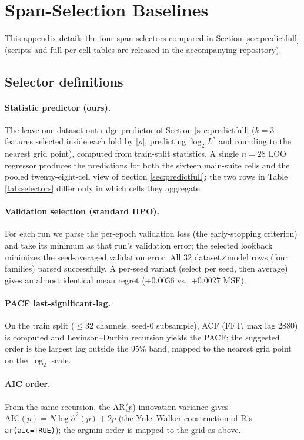 \section{Span-Selection Baselines}
\label{app:select}

This appendix details the four span selectors compared in Section \ref{sec:predictfull} (scripts and full per-cell tables are released in the accompanying repository).

\subsection{Selector definitions}

\paragraph{Statistic predictor (ours).} The leave-one-dataset-out ridge predictor of Section \ref{sec:predictfull} ($k{=}3$ features selected inside each fold by $|\rho|$, predicting $\log_2 L^*$ and rounding to the nearest grid point), computed from train-split statistics. A single $n{=}28$ LOO regressor produces the predictions for both the sixteen main-suite cells and the pooled twenty-eight-cell view of Section \ref{sec:predictfull}; the two rows in Table \ref{tab:selectors} differ only in which cells they aggregate.

\paragraph{Validation selection (standard HPO).} For each run we parse the per-epoch validation loss (the early-stopping criterion) and take its minimum as that run's validation error; the selected lookback minimizes the seed-averaged validation error. All 32 dataset$\times$model rows (four families) parsed successfully. A per-seed variant (select per seed, then average) gives an almost identical mean regret ($+0.0036$ vs.\ $+0.0027$ MSE).

\paragraph{PACF last-significant-lag.} On the train split ($\le 32$ channels, seed-0 subsample), ACF (FFT, max lag 2880) is computed and Levinson--Durbin recursion yields the PACF; the suggested order is the largest lag outside the 95\% band, mapped to the nearest grid point on the $\log_2$ scale.

\paragraph{AIC order.} From the same recursion, the AR($p$) innovation variance gives $\mathrm{AIC}(p) = N \log \hat{\sigma}^2(p) + 2p$ (the Yule--Walker construction of R's \texttt{ar(aic=TRUE)}); the argmin order is mapped to the grid as above.

